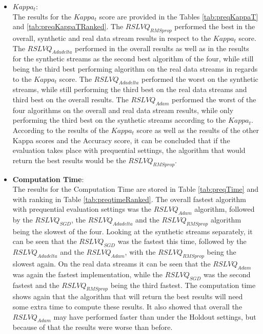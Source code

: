 \documentclass[12pt,oneside,a4paper,parskip]{scrbook}
\begin{document}
\begin{itemize}
  \item \textbf{$Kappa_t$}: \\
  The results for the $Kappa_t$ score are provided in the Tables \ref{tab:preqKappaT} and \ref{tab:preqKappaTRanked}.
  The $RSLVQ_\textit{RMSprop}$ performed the best in the overall, synthetic and real data stream results in respect to the
  $Kappa_t$ score. The $RSLVQ_\textit{Adadelta}$ performed in the overall results as well as in the results for the synthetic streams 
  as the second best algorithm of the four, while still being the third best performing algorithm on the real data streams in regards to 
  the $Kappa_t$ score. The $RSLVQ_\textit{Adadelta}$ performed the worst on the synthetic streams, while still performing the third best on 
  the real data streams and third best on the overall results.
  The $RSLVQ_\textit{Adam}$ performed the worst of the four algorithms on the overall and real data stream results, while only performing the third best
  on the synthetic streams according to the $Kappa_t$.
  According to the results of the $Kappa_t$ score as well as the results of the other Kappa scores and the Accuracy score, it can 
  be concluded that if the evaluation takes place with prequential settings, the algorithm that would return the best results would be the
  $RSLVQ_\textit{RMSprop}$.
  
  \item \textbf{Computation Time}: \\
  The results for the Computation Time are stored in Table \ref{tab:preqTime} and with ranking in Table \ref{tab:preqtimeRanked}.
  The overall fastest algorithm with prequential evaluation settings was the $RSLVQ_\textit{Adam}$ algorithm, followed by the 
  $RSLVQ_\textit{SGD}$, the $RSLVQ_\textit{Adadelta}$ and the $RSLVQ_\textit{RMSprop}$ algorithm being the slowest of the four.
  Looking at the synthetic streams separately, it can be seen that the $RSLVQ_\textit{SGD}$ was the fastest this time,
  followed by the $RSLVQ_\textit{Adadelta}$ and the $RSLVQ_\textit{Adam}$, with the $RSLVQ_\textit{RMSprop}$ being the slowest again.
  On the real data streams it can be seen that the $RSLVQ_\textit{Adam}$ was again the fastest implementation, while the $RSLVQ_\textit{SGD}$
  was the second fastest and the $RSLVQ_\textit{RMSprop}$ being the third fastest.
  The computation time shows again that the algorithm that will return the best results will need some extra time to compute
  these results.
  It also showed that overall the $RSLVQ_\textit{Adam}$ may have performed faster than under the Holdout settings, but because of that
  the results were worse than before.
  
\end{itemize}
\end{document}
